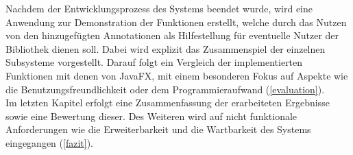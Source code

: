 Nachdem der Entwicklungsprozess des Systems beendet wurde, wird eine Anwendung zur Demonstration der Funktionen erstellt, welche durch das Nutzen von den hinzugefügten Annotationen als Hilfestellung für eventuelle Nutzer der Bibliothek dienen soll. Dabei wird explizit das Zusammenspiel der einzelnen Subsysteme vorgestellt. Darauf folgt ein Vergleich der implementierten Funktionen mit denen von JavaFX, mit einem besonderen Fokus auf Aspekte wie die Benutzungsfreundlichkeit oder dem Programmieraufwand (\autoref{evaluation}).\\
Im letzten Kapitel erfolgt eine Zusammenfassung der erarbeiteten Ergebnisse sowie eine Bewertung dieser. Des Weiteren wird auf nicht funktionale Anforderungen wie die Erweiterbarkeit und die Wartbarkeit des Systems eingegangen (\autoref{fazit}).